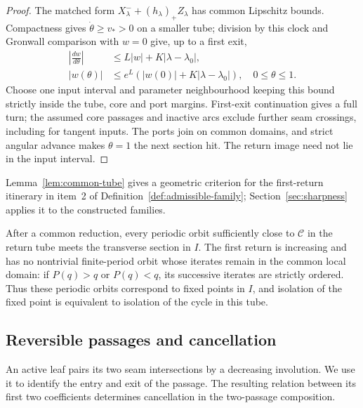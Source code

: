 \begin{proof}
The matched form $X^-_\lambda+(h_\lambda)_+Z_\lambda$ has common
Lipschitz bounds. Compactness gives $\dot\theta\ge v_*>0$ on a smaller
tube; division by this clock and Gronwall comparison with $w=0$ give,
up to a first exit,
\[
 \begin{aligned}
 \left|\frac{dw}{d\theta}\right|&\le L|w|+K|\lambda-\lambda_0|,\\
 |w(\theta)|&\le e^L(|w(0)|+K|\lambda-\lambda_0|),\quad0\le\theta\le1.
 \end{aligned}
\]
Choose one input interval and parameter neighbourhood keeping this bound
strictly inside the tube, core and port margins. First-exit continuation
gives a full turn; the assumed core passages and inactive arcs exclude
further seam crossings, including for tangent inputs. The ports join on common
domains, and strict angular advance makes $\theta=1$ the next section hit.
The return image need not lie in the input interval.
\end{proof}

Lemma~\ref{lem:common-tube} gives a geometric criterion for the first-return
itinerary in item~2 of Definition~\ref{def:admissible-family}; Section~\ref{sec:sharpness} applies it
to the constructed families.

\begin{remark}\label{rem:cycle-fixed-point}
After a common reduction, every periodic orbit sufficiently close to
$\mathcal C$ in the return tube meets the transverse section in $I$.
The first return is increasing and has no nontrivial finite-period orbit
whose iterates remain in the common local domain: if $P(q)>q$ or $P(q)<q$,
its successive iterates are strictly ordered. Thus these periodic orbits
correspond to fixed points in $I$, and isolation of the fixed point is
equivalent to isolation of the cycle in this tube.
\end{remark}

\subsection{Reversible passages and cancellation}
\label{sec:neutral-reference}\label{sec:center-multiplicity}

An active leaf pairs its two seam intersections by a decreasing
involution. We use it to identify the entry and exit of the passage.
The resulting relation between its first two coefficients determines
cancellation in the two-passage composition.


